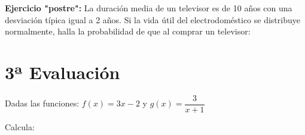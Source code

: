 \documentclass[addpoints,spanish, 12pt,a4paper]{exam}
\begin{document}
\begin{questions}
\question[1] \textbf{Ejercicio "postre":} La duración media de un televisor es de 10 años con una desviación típica igual a 2 años. Si la
vida útil del electrodoméstico se distribuye normalmente, halla la probabilidad de que al comprar
un televisor: 
    
        


        
        
        
\section*{3ª Evaluación}    

\question[1] Dadas las funciones: $f(x)=3x-2$ y $g(x)=\dfrac{3}{x+1}$
\begin{multicols}{1}

\end{multicols}        
        
    
        \question[1] Calcula: 
        \begin{multicols}{2}
\end{multicols}
\end{questions}
\end{document}
